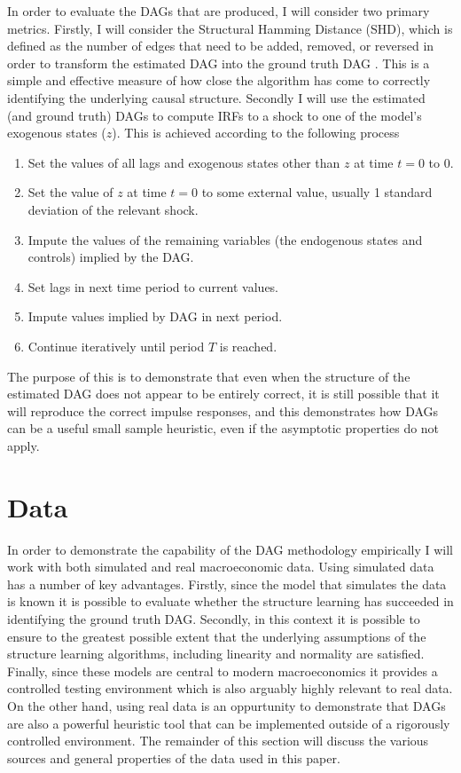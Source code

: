 \documentclass{article}
\begin{document}
In order to evaluate the DAGs that are produced, I will consider two primary metrics. Firstly, I will consider the Structural Hamming Distance (SHD), which is defined as the number of edges that need to be added, removed, or reversed in order to transform the estimated DAG into the ground truth DAG \parencite{tsamardinos2006max}. This is a simple and effective measure of how close the algorithm has come to correctly identifying the underlying causal structure. Secondly I will use the estimated (and ground truth) DAGs to compute IRFs to a shock to one of the model's exogenous states ($z$). This is achieved according to the following process

\begin{enumerate}
  \item Set the values of all lags and exogenous states other than $z$ at time $t=0$ to 0.
  \item Set the value of $z$ at time $t=0$ to some external value, usually 1 standard deviation of the relevant shock.
  \item Impute the values of the remaining variables (the endogenous states and controls) implied by the DAG.
  \item Set lags in next time period to current values.
  \item Impute values implied by DAG in next period.
  \item Continue iteratively until period $T$ is reached.
\end{enumerate}

The purpose of this is to demonstrate that even when the structure of the estimated DAG does not appear to be entirely correct, it is still possible that it will reproduce the correct impulse responses, and this demonstrates how DAGs can be a useful small sample heuristic, even if the asymptotic properties do not apply.

\section{Data}

In order to demonstrate the capability of the DAG methodology empirically I will work with both simulated and real macroeconomic data. Using simulated data has a number of key advantages. Firstly, since the model that simulates the data is known it is possible to evaluate whether the structure learning has succeeded in identifying the ground truth DAG. Secondly, in this context it is possible to ensure to the greatest possible extent that the underlying assumptions of the structure learning algorithms, including linearity and normality are satisfied. Finally, since these models are central to modern macroeconomics it provides a controlled testing environment which is also arguably highly relevant to real data. On the other hand, using real data is an oppurtunity to demonstrate that DAGs are also a powerful heuristic tool that can be implemented outside of a rigorously controlled environment. The remainder of this section will discuss the various sources and general properties of the data used in this paper.
\end{document}
